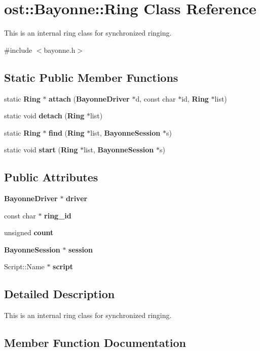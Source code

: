 \section{ost::Bayonne::Ring Class Reference}
\label{classost_1_1_bayonne_1_1_ring}


This is an internal ring class for synchronized ringing.  


{\ttfamily \#include $<$bayonne.h$>$}\subsection*{Static Public Member Functions}
\begin{DoxyCompactItemize}
\item 
static {\bf Ring} $\ast$ {\bf attach} ({\bf BayonneDriver} $\ast$d, const char $\ast$id, {\bf Ring} $\ast$list)
\item 
static void {\bf detach} ({\bf Ring} $\ast$list)
\item 
static {\bf Ring} $\ast$ {\bf find} ({\bf Ring} $\ast$list, {\bf BayonneSession} $\ast$s)
\item 
static void {\bf start} ({\bf Ring} $\ast$list, {\bf BayonneSession} $\ast$s)
\end{DoxyCompactItemize}
\subsection*{Public Attributes}
\begin{DoxyCompactItemize}
\item 
{\bf BayonneDriver} $\ast$ {\bf driver}
\item 
const char $\ast$ {\bf ring\_\-id}
\item 
unsigned {\bf count}
\item 
{\bf BayonneSession} $\ast$ {\bf session}
\item 
Script::Name $\ast$ {\bf script}
\end{DoxyCompactItemize}


\subsection{Detailed Description}
This is an internal ring class for synchronized ringing. 

\subsection{Member Function Documentation}
